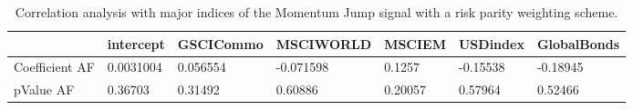 \begin{table}[H]
\centering
\begin{tabular}{lllllll}
& intercept & GSCICommo & MSCIWORLD & MSCIEM & USDindex & GlobalBonds \\ 
\hline 
Coefficient AF & 0.0031004 & 0.056554 & -0.071598 & 0.1257 & -0.15538 & -0.18945 \\ 
pValue AF & 0.36703 & 0.31492 & 0.60886 & 0.20057 & 0.57964 & 0.52466 \\ 
\hline
\end{tabular}
\caption{Correlation analysis with major indices of the Momentum Jump signal with a risk parity weighting scheme.}
\label{MOMJUMPRP_AFACTOR}
\end{table}